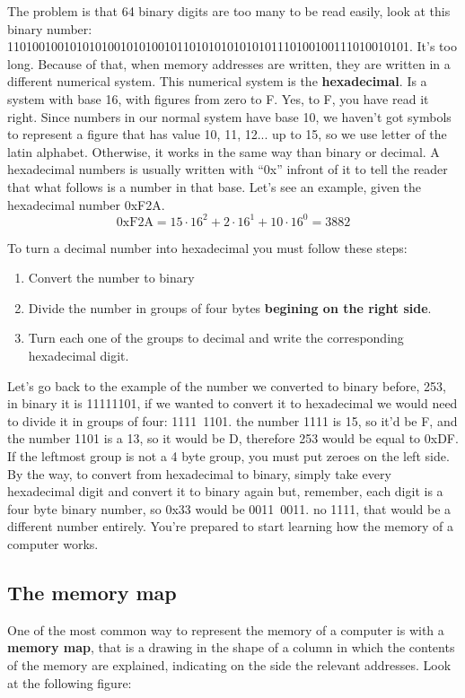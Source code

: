 \documentclass[a4paper]{article}
\begin{document}
The problem is that 64 binary digits are too many to be read easily, look at
this binary number:
1101001001010101001010100101101010101010101110100100111010010101. It's too long.
Because of that, when memory addresses are written, they are written in a
different numerical system. This numerical system is the \textbf{hexadecimal}.
Is a system with base 16, with figures from zero to F. Yes, to F, you have read it
right. Since numbers in our normal system have base 10, we haven't got symbols
to represent a figure that has value 10, 11, 12... up to 15, so we use letter of
the latin alphabet. Otherwise, it works in the same way than binary or
decimal. A hexadecimal numbers is usually written with ``0x'' infront of it
to tell the reader that what follows is a number in that base. Let's see an
example, given the hexadecimal number 0xF2A.
$$
\mathrm{0xF2A} = 15\cdot16^2 + 2\cdot16^1 + 10\cdot16^0 = 3882
$$

To turn a decimal number into hexadecimal you must follow these steps:
\begin{enumerate}
\item Convert the number to binary
\item Divide the number in groups of four bytes \textbf{begining on the right
side}.
\item Turn each one of the groups to decimal and write the corresponding
hexadecimal digit.
\end{enumerate}

Let's go back to the example of the number we converted to binary before, 253,
in binary it is 11111101, if we wanted to convert it to hexadecimal we would
need to divide it in groups of four: 1111~1101. the number 1111 is 15, so it'd
be F, and the number 1101 is a 13, so it would be D, therefore 253 would be
equal to 0xDF. If the leftmost group is not a 4 byte group, you must put zeroes
on the left side. By the way, to convert from hexadecimal to binary, simply take
every hexadecimal digit and convert it to binary again but, remember, each
digit is a four byte binary number, so 0x33 would be 0011~0011. no 1111, that
would be a different number entirely. You're prepared to start learning how the
memory of a computer works.

\subsection{The memory map}
One of the most common way to represent the memory of a computer is with a
\textbf{memory map}, that is a drawing in the shape of a column in which the
contents of the memory are explained, indicating on the side the relevant
addresses. Look at the following figure:
\end{document}
